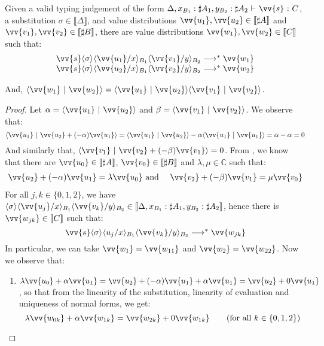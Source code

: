 \documentclass[runningheads,orivec,envcountsame,envcountsect]{llncs}
\newcommand\lra{\longrightarrow}
\newcommand\ansubst[2]{\ensuremath{\langle #1 \rangle_{#2}}}
\def\C{\mathbb{C}}            %
\def\scal#1#2{\langle{#1}~|~{#2}\rangle}
\def\eval{\lra^*}
\def\sem#1{\llbracket#1\rrbracket}
\def\TYP#1#2#3{#1~{\vdash}~#2~{:}~#3}
\begin{document}
\begin{lemma}\label{lem:UnitPreserTens} %
Given a valid typing judgement of the form $\TYP{\Delta,x_{B_1}:\sharp A_1, y_{B_2}:\sharp A_2}{\vv{s}}{C}$, a substitution $\sigma\in\sem{\Delta}$, and value distributions $\vv{u_1},\vv{u_2}\in\sem{\sharp A}$ and $\vv{v_1},\vv{v_2}\in\sem{\sharp B}$, there are value distributions $\vv{w_1},\vv{w_2}\in\sem{C}$ such that:
\[
\begin{array}{c}
    \vv{s}\ansubst{\sigma}{}\ansubst{\vv{u_1}/x}{B_1}{\ansubst{\vv{v_1}/y}{B_2}}\eval\vv{w_1}\\
    \vv{s}\ansubst{\sigma}{}\ansubst{\vv{u_2}/x}{B_1}{\ansubst{\vv{v_2}/y}{B_2}}\eval\vv{w_2}\\
\end{array}
\]

And, $\scal{\vv{w_1}}{\vv{w_2}} = \scal{\vv{u_1}}{\vv{u_2}} \scal{\vv{v_1}}{\vv{v_2}}$.

\begin{proof}
    Let $\alpha=\scal{\vv{u_1}}{\vv{u_2}}$ and $\beta=\scal{\vv{v_1}}{\vv{v_2}}$. We observe that:
    \[
    \scal{\vv{u_1}}{\vv{u_2}+(-\alpha)\vv{u_1}} = \scal{\vv{u_1}}{\vv{u_2}} - \alpha \scal{\vv{u_1}}{\vv{u_1}} = \alpha - \alpha = 0
    \]
    And similarly that, $\scal{\vv{v_1}}{\vv{v_2}+ (-\beta) \vv{v_1}} = 0$. From , we know that there are $\vv{u_0}\in\sem{\sharp A}$, $\vv{v_0}\in\sem{\sharp B}$ and $\lambda,\mu\in\C$ such that:
    \begin{align*}
        \vv{u_2} +(-\alpha)\vv{u_1} = \lambda\vv{u_0}& \text{ and } & \vv{v_2} + (-\beta)\vv{v_1} = \mu\vv{v_0} 
    \end{align*}
    For all $j,k\in\{0,1,2\}$, we have$\ansubst{\sigma}{}\ansubst{\vv{u_j}/x}{B_1}\ansubst{\vv{v_k}/y}{B_2}\in\sem{\Delta,x_{B_1}:\sharp A_1, y_{B_2}:\sharp A_2}$, hence there is $\vv{w_{jk}}\in\sem{C}$ such that:
    \[
    \vv{s}\ansubst{\sigma}{}\ansubst{u_j/x}{B_1}\ansubst{\vv{v_k}/y}{B_2}\eval\vv{w_{jk}}
    \]
    In particular, we can take $\vv{w_1}=\vv{w_{11}}$ and $\vv{w_2}=\vv{w_{22}}$. Now we observe that:
    \begin{enumerate}
        \item\label{A9:it1} $\lambda \vv{u_0} + \alpha\vv{u_1}=\vv{u_2} + (-\alpha) \vv{u_1} + \alpha \vv{u_1} = \vv{u_2} + 0 \vv{u_1}$, so that from the linearity of the substitution, linearity of evaluation and uniqueness of normal forms, we get:
        \[
        \lambda\vv{w_{0k}} + \alpha \vv{w_{1k}} = \vv{w_{2k}} + 0 \vv{w_{1k}} \qquad(\text{for all }k\in\{0,1,2\})
        \]
        

\end{enumerate}
\end{proof}
\end{lemma}
\end{document}
